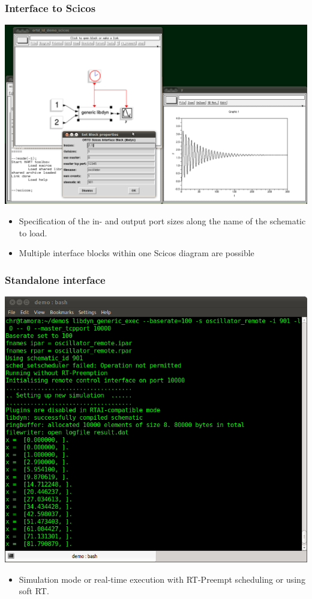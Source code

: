 \documentclass[serif,9pt,xcolor=dvipsnames]{beamer}
\begin{document}
\begin{frame}[fragile]
  \frametitle{Interface to Scicos}

  \centering \includegraphics[trim=0mm 0mm 80mm 80mm, clip, width=1\linewidth]{figures/ortd_scicos_interface.png} 

  \begin{itemize}
   \item Specification of the in- and output port sizes along the name of the schematic to load.
   \item Multiple interface blocks within one Scicos diagram are possible
  \end{itemize}

\end{frame}


\begin{frame}[fragile]
  \frametitle{Standalone interface}

  \centering \includegraphics[trim=0mm 0mm 00mm 00mm, clip, width=0.8\linewidth]{figures/start_from_console.png} 

  \begin{itemize}
   \item Simulation mode or real-time execution with RT-Preempt scheduling or using soft RT.
  \end{itemize}

\end{frame}
\end{document}
